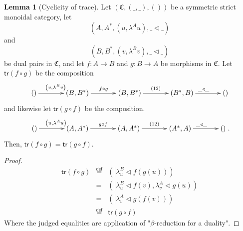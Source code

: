 \documentclass[pra,floatfix,
amsmath,superscriptaddress, 12pt]{article}
\theoremstyle{definition}
\newtheorem{lem}[thm]{Lemma}
\begin{document}
\begin{lem}
[Cyclicity of trace] Let $\left(\mathfrak{C},\left(\_,\_\right),\left(\right)\right)$
be a symmetric strict monoidal category, let 
\[
\left(A,A^{*},\left(u,\lambda^{A}u\right),\_\triangleleft\_\right)
\]
 and 
\[
\left(B,B^{*},\left(v,\lambda^{B}v\right),\_\triangleleft\_\right)
\]
 be dual pairs in $\mathfrak{C}$, and let $f:A\longrightarrow B$ and $g:B\longrightarrow A$
be morphisms in $\mathfrak{C}$. Let $\mathsf{tr}\left(f\circ g\right)$ be
the composition 
\[
\xymatrixrowsep{0pc}\xymatrixcolsep{3pc}\xymatrix{\left(\right)\ar[r]^{\left(v,\lambda^{B}v\right)} & \left(B,B^{*}\right)\ar[r]^{f\circ g} & \left(B,B^{*}\right)\ar[r]^{\left(12\right)} & \left(B^{*},B\right)\ar[r]^{\_\triangleleft\_} & \left(\right)}
\]
and likewise let $\mathsf{tr}\left(g\circ f\right)$ be the composition.
\[
\xymatrixrowsep{0pc}\xymatrixcolsep{3pc}\xymatrix{\left(\right)\ar[r]^{\left(u,\lambda^{A}u\right)} & \left(A,A^{*}\right)\ar[r]^{g\circ f} & \left(A,A^{*}\right)\ar[r]^{\left(12\right)} & \left(A^{*},A\right)\ar[r]^{\_\triangleleft\_} & \left(\right)}
.
\]
Then, $\mathsf{tr}\left(f\circ g\right)=\mathsf{tr}\left(g\circ f\right)$.
\end{lem}

\begin{proof}
\begin{eqnarray*}
\mathsf{tr}\left(f\circ g\right) & \overset{\mathsf{def}}{=} & \left(\left|\lambda_{u}^{B}\triangleleft f\left(g\left(u\right)\right)\right.\right)\\
 & = & \left(\left|\lambda_{u}^{B}\triangleleft f\left(v\right)\right.,\lambda_{v}^{A}\triangleleft g\left(u\right)\right)\\
 & = & \left(\left|\lambda_{v}^{A}\triangleleft g\left(f\left(v\right)\right)\right.\right)\\
 & \overset{\mathsf{def}}{=} & \mathsf{tr}\left(g\circ f\right)
\end{eqnarray*}
Where the judged equalities are application of "$\beta$-reduction
for a duality".
\end{proof}
\end{document}
